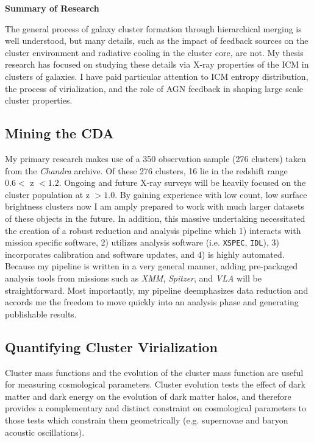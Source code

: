 \documentclass[11pt]{article}
\begin{document}
\begin{center}
\textbf{Summary of Research}\\
\end{center}
\normalsize

The general process of galaxy cluster formation through hierarchical
merging is well understood, but many details, such as the impact of
feedback sources on the cluster environment and radiative cooling in
the cluster core, are not. My thesis research has focused on studying
these details via X-ray properties of the ICM in clusters of
galaxies. I have paid particular attention to ICM entropy
distribution, the process of virialization, and the role of AGN
feedback in shaping large scale cluster properties.

\subsection*{Mining the CDA}

My primary research makes use of a 350 observation sample (276
clusters) taken from the {\textit{Chandra}} archive. Of these 276
clusters, 16 lie in the redshift range $0.6 <$ z $< 1.2$. Ongoing and
future X-ray surveys will be heavily focused on the cluster population
at z $> 1.0$. By gaining experience with low count, low surface
brightness clusters now I am amply prepared to work with much larger
datasets of these objects in the future. In addition, this massive
undertaking necessitated the creation of a robust reduction and
analysis pipeline which 1) interacts with mission specific software,
2) utilizes analysis software (i.e. {\tt{XSPEC}}, {\tt{IDL}}), 3)
incorporates calibration and software updates, and 4) is highly
automated. Because my pipeline is written in a very general manner,
adding pre-packaged analysis tools from missions such as
{\textit{XMM}}, {\textit{Spitzer}}, and {\textit{VLA}} will be
straightforward. Most importantly, my pipeline deemphasizes data
reduction and accords me the freedom to move quickly into an analysis
phase and generating publishable results.

\subsection*{Quantifying Cluster Virialization}

Cluster mass functions and the evolution of the cluster mass function
are useful for measuring cosmological parameters. Cluster evolution
tests the effect of dark matter and dark energy on the evolution of
dark matter halos, and therefore provides a complementary and distinct
constraint on cosmological parameters to those tests which constrain
them geometrically (e.g. supernovae and baryon acoustic
oscillations).
\end{document}
